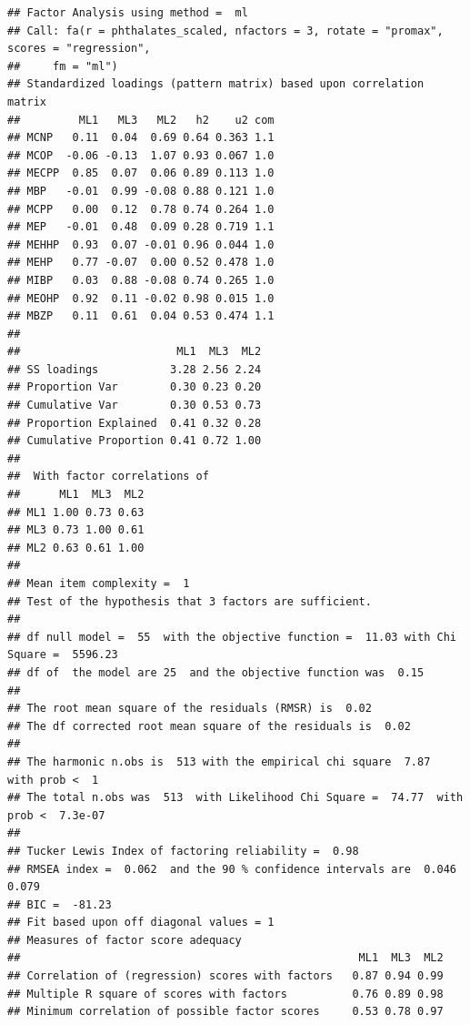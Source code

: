 \documentclass[
]{article}
\newenvironment{Shaded}{\begin{snugshade}}{\end{snugshade}}
\newcommand{\AttributeTok}[1]{\textcolor[rgb]{0.13,0.29,0.53}{#1}}
\newcommand{\FloatTok}[1]{\textcolor[rgb]{0.00,0.00,0.81}{#1}}
\newcommand{\FunctionTok}[1]{\textcolor[rgb]{0.13,0.29,0.53}{\textbf{#1}}}
\newcommand{\NormalTok}[1]{#1}
\newcommand{\SpecialCharTok}[1]{\textcolor[rgb]{0.81,0.36,0.00}{\textbf{#1}}}
\begin{document}
\begin{verbatim}
## Factor Analysis using method =  ml
## Call: fa(r = phthalates_scaled, nfactors = 3, rotate = "promax", scores = "regression", 
##     fm = "ml")
## Standardized loadings (pattern matrix) based upon correlation matrix
##         ML1   ML3   ML2   h2    u2 com
## MCNP   0.11  0.04  0.69 0.64 0.363 1.1
## MCOP  -0.06 -0.13  1.07 0.93 0.067 1.0
## MECPP  0.85  0.07  0.06 0.89 0.113 1.0
## MBP   -0.01  0.99 -0.08 0.88 0.121 1.0
## MCPP   0.00  0.12  0.78 0.74 0.264 1.0
## MEP   -0.01  0.48  0.09 0.28 0.719 1.1
## MEHHP  0.93  0.07 -0.01 0.96 0.044 1.0
## MEHP   0.77 -0.07  0.00 0.52 0.478 1.0
## MIBP   0.03  0.88 -0.08 0.74 0.265 1.0
## MEOHP  0.92  0.11 -0.02 0.98 0.015 1.0
## MBZP   0.11  0.61  0.04 0.53 0.474 1.1
## 
##                        ML1  ML3  ML2
## SS loadings           3.28 2.56 2.24
## Proportion Var        0.30 0.23 0.20
## Cumulative Var        0.30 0.53 0.73
## Proportion Explained  0.41 0.32 0.28
## Cumulative Proportion 0.41 0.72 1.00
## 
##  With factor correlations of 
##      ML1  ML3  ML2
## ML1 1.00 0.73 0.63
## ML3 0.73 1.00 0.61
## ML2 0.63 0.61 1.00
## 
## Mean item complexity =  1
## Test of the hypothesis that 3 factors are sufficient.
## 
## df null model =  55  with the objective function =  11.03 with Chi Square =  5596.23
## df of  the model are 25  and the objective function was  0.15 
## 
## The root mean square of the residuals (RMSR) is  0.02 
## The df corrected root mean square of the residuals is  0.02 
## 
## The harmonic n.obs is  513 with the empirical chi square  7.87  with prob <  1 
## The total n.obs was  513  with Likelihood Chi Square =  74.77  with prob <  7.3e-07 
## 
## Tucker Lewis Index of factoring reliability =  0.98
## RMSEA index =  0.062  and the 90 % confidence intervals are  0.046 0.079
## BIC =  -81.23
## Fit based upon off diagonal values = 1
## Measures of factor score adequacy             
##                                                    ML1  ML3  ML2
## Correlation of (regression) scores with factors   0.87 0.94 0.99
## Multiple R square of scores with factors          0.76 0.89 0.98
## Minimum correlation of possible factor scores     0.53 0.78 0.97
\end{verbatim}

\begin{Shaded}
\end{Shaded}
\end{document}
